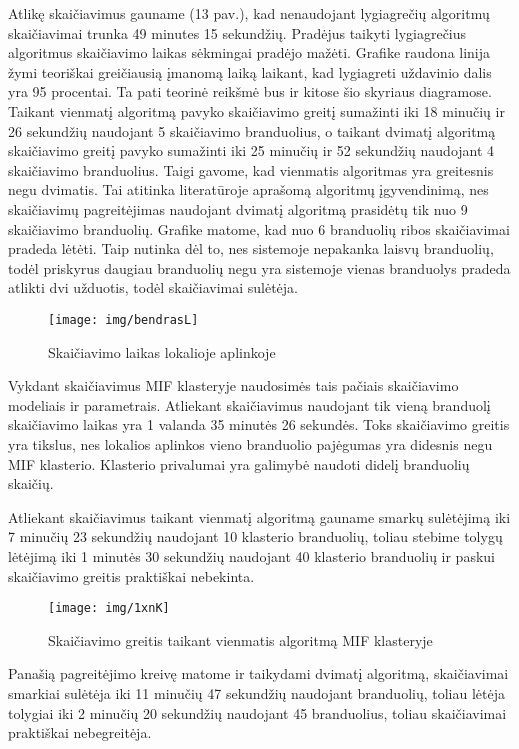 \documentclass{VUMIFPSkursinis}
\begin{document}
Atlikę skaičiavimus gauname (13 pav.), kad nenaudojant lygiagrečių algoritmų skaičiavimai trunka 49 minutes 15 sekundžių.
Pradėjus taikyti lygiagrečius algoritmus skaičiavimo laikas sėkmingai pradėjo mažėti.
Grafike raudona linija žymi teoriškai greičiausią įmanomą laiką laikant, kad lygiagreti uždavinio dalis yra 95 procentai.
Ta pati teorinė reikšmė bus ir kitose šio skyriaus diagramose.
Taikant vienmatį algoritmą pavyko skaičiavimo greitį sumažinti iki 18 minučių ir 26 sekundžių naudojant 5 skaičiavimo branduolius, o taikant dvimatį algoritmą skaičiavimo greitį pavyko sumažinti iki 25 minučių ir 52 sekundžių naudojant 4 skaičiavimo branduolius.
Taigi gavome, kad vienmatis algoritmas yra greitesnis negu dvimatis. Tai atitinka literatūroje aprašomą algoritmų įgyvendinimą, nes skaičiavimų pagreitėjimas naudojant dvimatį algoritmą prasidėtų tik nuo 9 skaičiavimo branduolių.
Grafike matome, kad nuo 6 branduolių ribos skaičiavimai pradeda lėtėti.
Taip nutinka dėl to, nes sistemoje nepakanka laisvų branduolių, todėl priskyrus daugiau branduolių negu yra sistemoje vienas branduolys pradeda atlikti dvi užduotis, todėl skaičiavimai sulėtėja.

\begin{figure}[H]
\centering
\texttt{[image: img/bendrasL]}
\caption{Skaičiavimo laikas lokalioje aplinkoje} %
\label{img:text}
\end{figure}

Vykdant skaičiavimus MIF klasteryje naudosimės tais pačiais skaičiavimo modeliais ir parametrais.
Atliekant skaičiavimus naudojant tik vieną branduolį skaičiavimo laikas yra 1 valanda 35 minutės 26 sekundės.
Toks skaičiavimo greitis yra tikslus, nes lokalios aplinkos vieno branduolio pajėgumas yra didesnis negu MIF klasterio.
Klasterio privalumai yra galimybė naudoti didelį branduolių skaičių.


Atliekant skaičiavimus taikant vienmatį algoritmą gauname smarkų sulėtėjimą iki 7 minučių 23 sekundžių naudojant 10 klasterio branduolių, toliau stebime tolygų lėtėjimą iki 1 minutės 30 sekundžių naudojant 40 klasterio branduolių ir paskui skaičiavimo greitis praktiškai nebekinta.


\begin{figure}[H]
\centering
\texttt{[image: img/1xnK]}
\caption{Skaičiavimo greitis taikant vienmatis algoritmą MIF klasteryje} %
\label{img:text}
\end{figure}

Panašią pagreitėjimo kreivę matome ir taikydami dvimatį algoritmą, skaičiavimai smarkiai sulėtėja iki 11 minučių 47 sekundžių naudojant branduolių, toliau lėtėja tolygiai iki 2 minučių 20 sekundžių naudojant 45 branduolius, toliau skaičiavimai praktiškai nebegreitėja.
\end{document}
